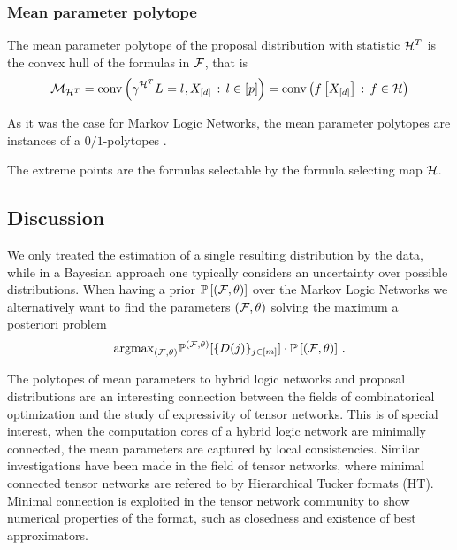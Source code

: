 \subsubsection{Mean parameter polytope}

The mean parameter polytope of the proposal distribution with statistic $\mathcal{H}^T$ is the convex hull of the formulas in $\mathcal{F}$, that is
\begin{align*}
	\mathcal{M}_{\mathcal{H}^T}
	= \mathrm{conv}\left(\gamma^{\mathcal{H}^T}{L_{}=l_{},X_{[d]}} \, : \, l\in[p]{}\right)
	= \mathrm{conv}\left(f\left[X_{[d]}\right] \, : \, f\in\mathcal{H}\right)
\end{align*}


As it was the case for Markov Logic Networks, the mean parameter polytopes are instances of a $0/1$-polytopes \cite{ziegler_lectures_1999,gillmann_01-polytopes_2007}.

The extreme points are the formulas selectable by the formula selecting map $\mathcal{H}$.


\subsection{Discussion}

\begin{remark}
	We only treated the estimation of a single resulting distribution by the data, while in a Bayesian approach one typically considers an uncertainty over possible distributions.
	When having a prior $\mathbb{P}\left[(\mathcal{F},\theta)\right]$ over the Markov Logic Networks we alternatively want to find the parameters $(\mathcal{F},\theta)$ solving the maximum a posteriori problem
	\begin{align}
		\mathrm{argmax}_{(\mathcal{F},\theta)} \mathbb{P}^{(\mathcal{F},\theta)}[\{D(j)\}_{j\in[m]}]\cdot \mathbb{P}\left[(\mathcal{F},\theta)\right]\, . 
	\end{align}
\end{remark}


The polytopes of mean parameters to hybrid logic networks and proposal distributions are an interesting connection between the fields of combinatorical optimization and the study of expressivity of tensor networks.
This is of special interest, when the computation cores of a hybrid logic network are minimally connected, the mean parameters are captured by local consistencies.
Similar investigations have been made in the field of tensor networks, where minimal connected tensor networks are refered to by Hierarchical Tucker formats (HT).
Minimal connection is exploited in the tensor network community to show numerical properties of the format, such as closedness and existence of best approximators.




